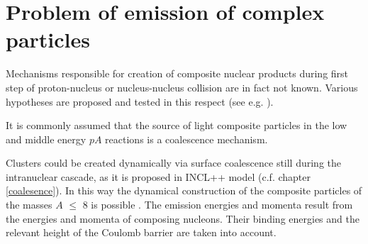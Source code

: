 
\section{Problem of emission of complex particles}

Mechanisms responsible for creation of composite nuclear
products during first step of proton-nucleus or nucleus-nucleus collision are in fact not known. 
Various hypotheses are proposed and tested in this respect 
(see e.g. \cite{LET02A,HODGSON20031,Iwamoto_2008,Wei_2014,PyszClus,PhysRevC.81.015803}). 

It is commonly assumed that the source of light composite particles in the low and middle energy $pA$ reactions is a coalescence mechanism. 

Clusters could be created dynamically via surface coalescence still during the intranuclear cascade, as it is proposed in INCL++ model  
(c.f. chapter \ref{coalesence}). In this way the dynamical construction of the composite particles of the masses $A$ $\le$ 8 is possible \cite{INCLboudard2013new}. The emission energies and momenta result from the energies and momenta of composing nucleons. Their binding energies and the relevant height of the Coulomb barrier are taken into account. 


